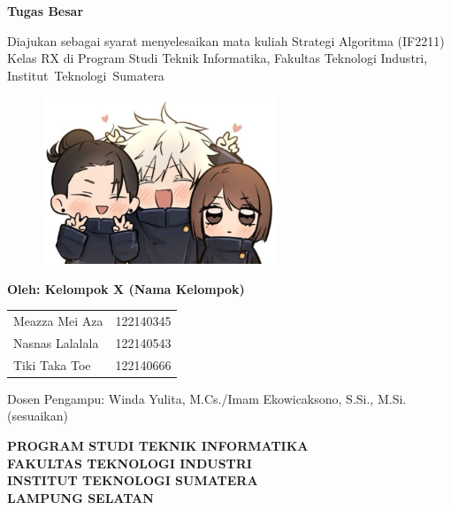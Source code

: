 \clearpage
\pagestyle{empty}

\begin{center}
    \smallskip

    {\fontsize{14pt}{16pt}\selectfont\bfseries \thetitle}

    \bigskip

    {\fontsize{14pt}{16pt}\selectfont\bfseries Tugas Besar}

    \medskip

    {\fontsize{12pt}{14pt}\selectfont
    Diajukan sebagai syarat menyelesaikan mata kuliah Strategi Algoritma (IF2211) Kelas RX di Program Studi Teknik Informatika, Fakultas Teknologi Industri, \mbox{Institut Teknologi Sumatera}}

    \vfill

    \begin{figure}[h]
        \centering
        \includegraphics[width=7cm, keepaspectratio]{figure/fototiga.jpg}
    \end{figure}

    \medskip

    {\fontsize{12pt}{14pt}\selectfont\bfseries Oleh: Kelompok X (Nama Kelompok)}

    {\fontsize{12pt}{14pt}\selectfont
    \begin{tabular}{ll}
        Meazza Mei Aza & 122140345 \\
        Nasnas Lalalala & 122140543 \\
        Tiki Taka Toe & 122140666 \\
    \end{tabular}
    }
    
    \bigskip
    
    {\fontsize{12pt}{14pt} Dosen Pengampu: Winda Yulita, M.Cs./Imam Ekowicaksono, S.Si., M.Si. (sesuaikan)
    }

    \vfill
    
    {\fontsize{14pt}{16pt}\selectfont\bfseries\MakeUppercase{
    Program Studi Teknik Informatika \\
        Fakultas Teknologi Industri\\
        Institut Teknologi Sumatera\\
        Lampung Selatan\\
    } 
        \the\year
    }

\end{center}

\clearpage